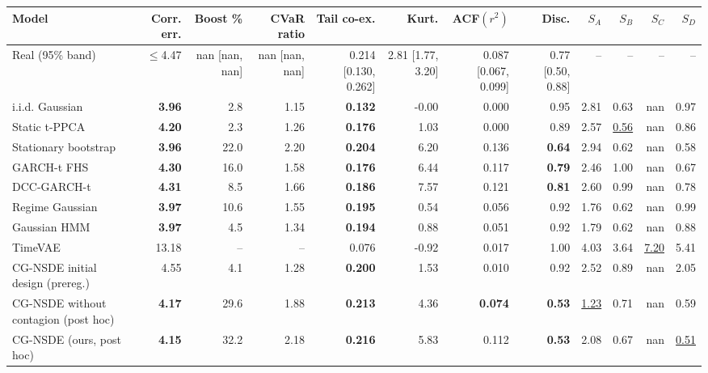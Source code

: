 \begin{tabular}{lrrrrrrrrrrr}
\toprule
Model & Corr. err. & Boost \% & CVaR ratio & Tail co-ex. & Kurt. & ACF$(r^2)$ & Disc. & $S_A$ & $S_B$ & $S_C$ & $S_D$ \\
\midrule
Real (95\% band) & $\le$4.47 & nan [nan, nan] & nan [nan, nan] & 0.214 [0.130, 0.262] & 2.81 [1.77, 3.20] & 0.087 [0.067, 0.099] & 0.77 [0.50, 0.88] & -- & -- & -- & -- \\
\midrule
i.i.d. Gaussian & \textbf{3.96} & 2.8 & 1.15 & \textbf{0.132} & -0.00 & 0.000 & 0.95 & 2.81 & 0.63 & nan & 0.97 \\
Static t-PPCA & \textbf{4.20} & 2.3 & 1.26 & \textbf{0.176} & 1.03 & 0.000 & 0.89 & 2.57 & \underline{0.56} & nan & 0.86 \\
Stationary bootstrap & \textbf{3.96} & 22.0 & 2.20 & \textbf{0.204} & 6.20 & 0.136 & \textbf{0.64} & 2.94 & 0.62 & nan & 0.58 \\
GARCH-t FHS & \textbf{4.30} & 16.0 & 1.58 & \textbf{0.176} & 6.44 & 0.117 & \textbf{0.79} & 2.46 & 1.00 & nan & 0.67 \\
DCC-GARCH-t & \textbf{4.31} & 8.5 & 1.66 & \textbf{0.186} & 7.57 & 0.121 & \textbf{0.81} & 2.60 & 0.99 & nan & 0.78 \\
Regime Gaussian & \textbf{3.97} & 10.6 & 1.55 & \textbf{0.195} & 0.54 & 0.056 & 0.92 & 1.76 & 0.62 & nan & 0.99 \\
Gaussian HMM & \textbf{3.97} & 4.5 & 1.34 & \textbf{0.194} & 0.88 & 0.051 & 0.92 & 1.79 & 0.62 & nan & 0.88 \\
TimeVAE & 13.18 & -- & -- & 0.076 & -0.92 & 0.017 & 1.00 & 4.03 & 3.64 & \underline{7.20} & 5.41 \\
CG-NSDE initial design (prereg.) & 4.55 & 4.1 & 1.28 & \textbf{0.200} & 1.53 & 0.010 & 0.92 & 2.52 & 0.89 & nan & 2.05 \\
CG-NSDE without contagion (post hoc) & \textbf{4.17} & 29.6 & 1.88 & \textbf{0.213} & 4.36 & \textbf{0.074} & \textbf{0.53} & \underline{1.23} & 0.71 & nan & 0.59 \\
CG-NSDE (ours, post hoc) & \textbf{4.15} & 32.2 & 2.18 & \textbf{0.216} & 5.83 & 0.112 & \textbf{0.53} & 2.08 & 0.67 & nan & \underline{0.51} \\
\bottomrule
\end{tabular}
